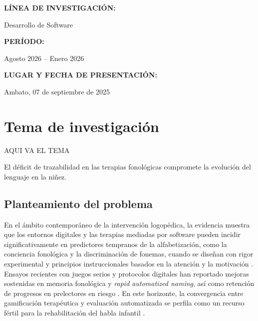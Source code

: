 \documentclass[12pt, oneside]{article}
\begin{document}
\begin{titlepage}
    \vspace{0.8cm}
    \textbf{LÍNEA DE INVESTIGACIÓN:} \\
    \begin{center}Desarrollo de Software\end{center}
    
    \vspace{0.8cm}
    \textbf{PERÍODO:} \\
    \begin{center}Agosto 2026 -- Enero 2026\end{center}
    
    \vspace{0.8cm}
    \textbf{LUGAR Y FECHA DE PRESENTACIÓN:} \\
    \begin{center}Ambato, 07 de septiembre de 2025\end{center}
    
    \vfill
\end{titlepage}


\tableofcontents
\newpage



\newpage

\section{Tema de investigación}
AQUI VA EL TEMA

El déficit de trazabilidad en las terapias fonológicas compromete la evolución del lenguaje en la niñez.

\subsection{Planteamiento del problema}
En el ámbito contemporáneo de la intervención logopédica, la evidencia muestra que los entornos digitales y las terapias mediadas por software pueden incidir significativamente en predictores tempranos de la alfabetización, como la conciencia fonológica y la discriminación de fonemas, cuando se diseñan con rigor experimental y principios instruccionales basados en la atención y la motivación \parencite{Bertoni2024,Vonthron2024,Zhou2025}. Ensayos recientes con juegos serios y protocolos digitales han reportado mejoras sostenidas en memoria fonológica y \textit{rapid automatized naming}, así como retención de progresos en prelectores en riesgo \parencite{Bertoni2024,Gijbels2024}. En este horizonte, la convergencia entre gamificación terapéutica y evaluación automatizada se perfila como un recurso fértil para la rehabilitación del habla infantil \parencite{Kim2023,Glatz2023}.
\end{document}

